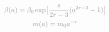 \documentclass[preview]{standalone}
\begin{document}
\begin{gather}
\notag
\textcolor{Gray}{\beta(a) = \beta_{0} \exp \bigl[ \frac{s}{2r-3}(a^{2r-3}-1) \bigr] } \\ 
\notag
\textcolor{Gray}{m(a) = m_{0} a^{-r}} 
\end{gather}
\end{document}
